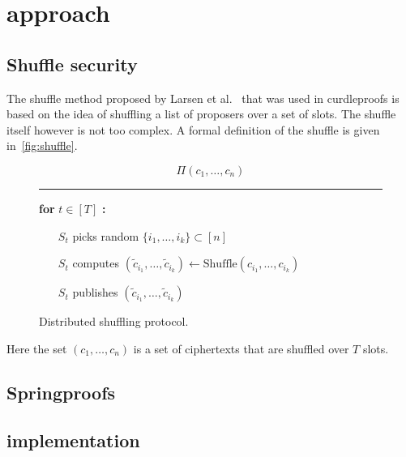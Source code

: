 \section{approach}\label{sec:approach}


\subsection{Shuffle security}\label{sec:approach-shuffle-security}
The shuffle method proposed by Larsen et al.~\cite{cryptoeprint:2022/560} that was used in curdleproofs is based on the idea of shuffling a list of proposers over a set of slots.
The shuffle itself however is not too complex.
A formal definition of the shuffle is given in~\autoref{fig:shuffle}.

\begin{figure}[ht]\label{fig:shuffle}

    \begin{framed}
        \[
            \Pi(c_1, \ldots, c_n)
        \]
        \rule{\linewidth}{0.4pt}

        \noindent
        \textbf{for} $t \in [T]$ \textbf{:}
        \begin{itemize}
            \item[$S_t$] picks random $\{i_1, \ldots, i_k\} \subset [n]$
            \item[$S_t$] computes $(\tilde{c}_{i_1}, \ldots, \tilde{c}_{i_k}) \leftarrow \text{Shuffle}(c_{i_1}, \ldots, c_{i_k})$
            \item[$S_t$] publishes $(\tilde{c}_{i_1}, \ldots, \tilde{c}_{i_k})$
        \end{itemize}
    \end{framed}
    \caption{Distributed shuffling protocol.}
\end{figure}

Here the set $(c_1, \ldots, c_n)$ is a set of ciphertexts that are shuffled over $T$ slots.

\subsection{Springproofs}\label{sec:approach-springproofs}



\subsection{implementation}\label{sec:approach-implementation}


